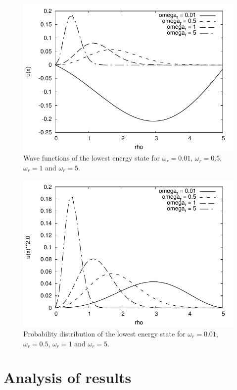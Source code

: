 \documentclass{article} %
\begin{document}
\begin{figure}[h]
	\includegraphics{waveplot}
	\caption{Wave functions of the lowest energy state for $\omega_r = 0.01$, $\omega_r = 0.5$, $\omega_r = 1$ and $\omega_r = 5$.}
	\label{fig:wave}
\end{figure}

\begin{figure}[h]
	\includegraphics{waveplotabs}
	\caption{Probability distribution of the lowest energy state for $\omega_r = 0.01$, $\omega_r = 0.5$, $\omega_r = 1$ and $\omega_r = 5$.}
	\label{fig:waveabs}
\end{figure}


\section{Analysis of results}
\end{document}

